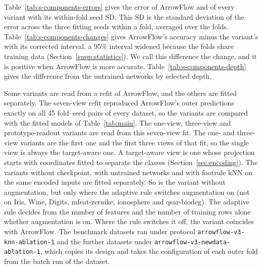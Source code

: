 Table~\ref{tab:s-components-errors} gives the error of ArrowFlow and of every variant with its within-fold seed SD. This SD is the standard deviation of the error across the three fitting seeds within a fold, averaged over the folds. Table~\ref{tab:s-components-changes} gives ArrowFlow's accuracy minus the variant's with its corrected interval, a 95\% interval widened because the folds share training data (Section~\ref{supp:statistics}). We call this difference the change, and it is positive when ArrowFlow is more accurate. Table~\ref{tab:s-components-depth} gives the difference from the untrained networks by selected depth.

Some variants are read from a refit of ArrowFlow, and the others are fitted separately. The seven-view refit reproduced ArrowFlow's outer predictions exactly on all 45 fold--seed pairs of every dataset, so the variants are compared with the fitted models of Table~\ref{tab:main}. The one-view, three-view and prototype-readout variants are read from this seven-view fit. The one- and three-view variants are the first one and the first three views of that fit, so the single view is always the target-aware one. A target-aware view is one whose projection starts with coordinates fitted to separate the classes (Section~\ref{sec:encoding}). The variants without checkpoint, with untrained networks and with footrule kNN on the same encoded inputs are fitted separately. So is the variant without augmentation, but only where the adaptive rule switches augmentation on (not on Iris, Wine, Digits, mfeat-zernike, ionosphere and qsar-biodeg). The adaptive rule decides from the number of features and the number of training rows alone whether augmentation is on. Where the rule switches it off, the variant coincides with ArrowFlow. The benchmark datasets ran under protocol \texttt{arrowflow-v3-knn-ablation-1} and the further datasets under \texttt{arrowflow-v3-newdata-ablation-1}, which copies its design and takes the configuration of each outer fold from the batch run of the dataset.





